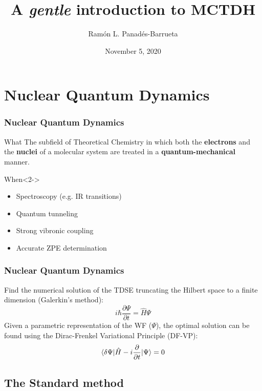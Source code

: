 \documentclass{beamer}
\title[Intro MCTDH]{A \emph{gentle} introduction to MCTDH}
\author[Panadés-Barrueta]{Ramón L. Panadés-Barrueta}
\institute{Computational Chemical Physics Group. \\ University of Twente.}
\date{\small November 5, 2020}
\begin{document}
\frame{\titlepage}

\begin{frame}
  \tableofcontents
\end{frame}

\section{Nuclear Quantum Dynamics}\label{nqd}

\begin{frame}
  \frametitle{Nuclear Quantum Dynamics}
  \begin{block}{What}
   \justifying{}
   The subfield of Theoretical Chemistry in which both the \textbf{electrons} and the \textbf{nuclei} of
   a molecular system are treated in a \textbf{quantum-mechanical} manner. 
  \end{block}
  \begin{exampleblock}{When}<2->
    \begin{itemize}
    \item Spectroscopy (e.g. IR transitions)
    \item Quantum tunneling
    \item Strong vibronic coupling
    \item Accurate ZPE determination
    \end{itemize}
  \end{exampleblock}
\end{frame}

\begin{frame}
  \frametitle{Nuclear Quantum Dynamics}
  Find the numerical solution of the TDSE truncating the Hilbert space to a finite dimension (Galerkin's method):
\begin{equation}
  i\hbar\frac{\partial\Psi}{\partial t} = \hat{H}\Psi
\end{equation}
Given a parametric representation of the WF (\(\Psi\)), the optimal solution can be found using the Dirac-Frenkel Variational Principle (DF-VP):
\begin{equation}
	\braket{\delta\Psi|\hat{H}-i\frac{\partial }{\partial t}|\Psi} = 0
\end{equation}
\end{frame}

\subsection{The Standard method}\label{stdmeth}
\end{document}
